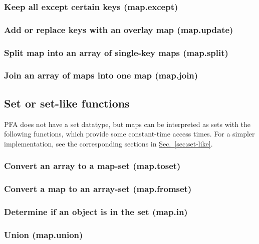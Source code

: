 \documentclass{article}
\theoremstyle{definition}
\begin{document}
\subsubsection{Keep all except certain keys (map.except)}

\subsubsection{Add or replace keys with an overlay map (map.update)}

\subsubsection{Split map into an array of single-key maps (map.split)}

\subsubsection{Join an array of maps into one map (map.join)}

\hypertarget{hsec:set-like-map}{}
\subsection{Set or set-like functions}
\label{sec:set-like-map}

PFA does not have a set datatype, but maps can be interpreted as sets with the following functions, which provide some constant-time access times.  For a simpler implementation, see the corresponding sections in \hyperlink{hsec:set-like}{Sec.~\ref{sec:set-like}}.

\subsubsection{Convert an array to a map-set (map.toset)}

\subsubsection{Convert a map to an array-set (map.fromset)}

\subsubsection{Determine if an object is in the set (map.in)}

\subsubsection{Union (map.union)}
\end{document}
